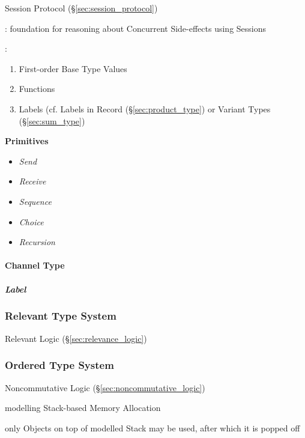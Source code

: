Session Protocol (\S\ref{sec:session_protocol})


\cite{orchard-yoshida15}: foundation for reasoning about Concurrent
Side-effects using Sessions


\cite{neubauer-thiemann04}:
\begin{enumerate}
  \item First-order Base Type Values
  \item Functions
  \item Labels (cf. Labels in Record (\S\ref{sec:product_type}) or
    Variant Types (\S\ref{sec:sum_type})
\end{enumerate}


\textbf{Primitives}

\begin{itemize}
  \item \emph{Send}
  \item \emph{Receive}
  \item \emph{Sequence}
  \item \emph{Choice}
  \item \emph{Recursion}
\end{itemize}



\paragraph{Channel Type}\label{sec:channel_type}\hfill

\subparagraph{Label}\label{sec:channel_label}\hfill



\subsubsection{Relevant Type System}\label{sec:relevant_type}

Relevant Logic (\S\ref{sec:relevance_logic})



\subsubsection{Ordered Type System}\label{sec:ordered_type}

Noncommutative Logic (\S\ref{sec:noncommutative_logic})

modelling Stack-based Memory Allocation

only Objects on top of modelled Stack may be used, after which it is
popped off



